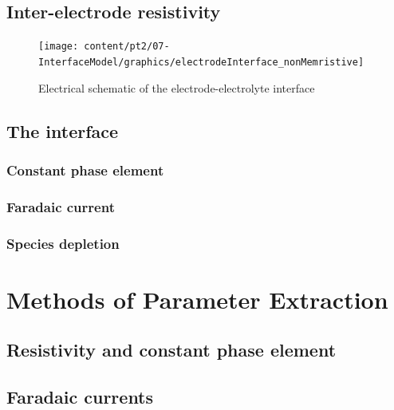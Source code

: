   \subsection{Inter-electrode resistivity}

  \begin{figure}
    \centering
    \texttt{[image: content/pt2/07-InterfaceModel/graphics/electrodeInterface\_nonMemristive]}
    \caption{\label{fig:pt2-electrodeInterface_nonMemristive}Electrical schematic of the electrode-electrolyte interface}
  \end{figure}

  \subsection{The interface}
    \subsubsection{Constant phase element}
    \subsubsection{Faradaic current}
    \subsubsection{Species depletion}
\section{Methods of Parameter Extraction}
  \subsection{Resistivity and constant phase element}
  \subsection{Faradaic currents}

